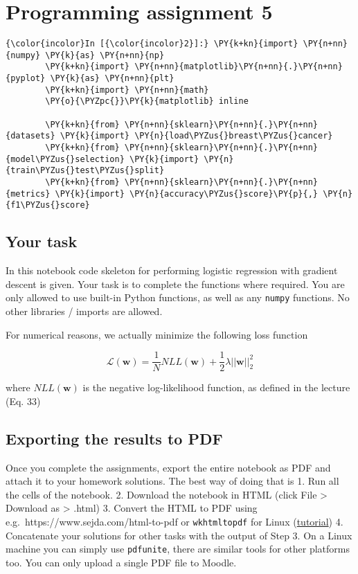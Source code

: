 \section{Programming assignment 5}

    \begin{Verbatim}[commandchars=\\\{\}]
{\color{incolor}In [{\color{incolor}2}]:} \PY{k+kn}{import} \PY{n+nn}{numpy} \PY{k}{as} \PY{n+nn}{np}
        \PY{k+kn}{import} \PY{n+nn}{matplotlib}\PY{n+nn}{.}\PY{n+nn}{pyplot} \PY{k}{as} \PY{n+nn}{plt}
        \PY{k+kn}{import} \PY{n+nn}{math}
        \PY{o}{\PYZpc{}}\PY{k}{matplotlib} inline
        
        \PY{k+kn}{from} \PY{n+nn}{sklearn}\PY{n+nn}{.}\PY{n+nn}{datasets} \PY{k}{import} \PY{n}{load\PYZus{}breast\PYZus{}cancer}
        \PY{k+kn}{from} \PY{n+nn}{sklearn}\PY{n+nn}{.}\PY{n+nn}{model\PYZus{}selection} \PY{k}{import} \PY{n}{train\PYZus{}test\PYZus{}split}
        \PY{k+kn}{from} \PY{n+nn}{sklearn}\PY{n+nn}{.}\PY{n+nn}{metrics} \PY{k}{import} \PY{n}{accuracy\PYZus{}score}\PY{p}{,} \PY{n}{f1\PYZus{}score}
\end{Verbatim}

    \hypertarget{your-task}{%
\subsection{Your task}\label{your-task}}

    In this notebook code skeleton for performing logistic regression with
gradient descent is given. Your task is to complete the functions where
required. You are only allowed to use built-in Python functions, as well
as any \texttt{numpy} functions. No other libraries / imports are
allowed.

    For numerical reasons, we actually minimize the following loss function

\[\mathcal{L}(\mathbf{w}) = \frac{1}{N} NLL(\mathbf{w}) +  \frac{1}{2}\lambda ||\mathbf{w}||^2_2\]

where \(NLL(\mathbf{w})\) is the negative log-likelihood function, as
defined in the lecture (Eq. 33)

    \hypertarget{exporting-the-results-to-pdf}{%
\subsection{Exporting the results to
PDF}\label{exporting-the-results-to-pdf}}

Once you complete the assignments, export the entire notebook as PDF and
attach it to your homework solutions. The best way of doing that is 1.
Run all the cells of the notebook. 2. Download the notebook in HTML
(click File \textgreater{} Download as \textgreater{} .html) 3. Convert
the HTML to PDF using e.g.~https://www.sejda.com/html-to-pdf or
\texttt{wkhtmltopdf} for Linux
(\href{https://www.cyberciti.biz/open-source/html-to-pdf-freeware-linux-osx-windows-software/}{tutorial})
4. Concatenate your solutions for other tasks with the output of Step 3.
On a Linux machine you can simply use \texttt{pdfunite}, there are
similar tools for other platforms too. You can only upload a single PDF
file to Moodle.


